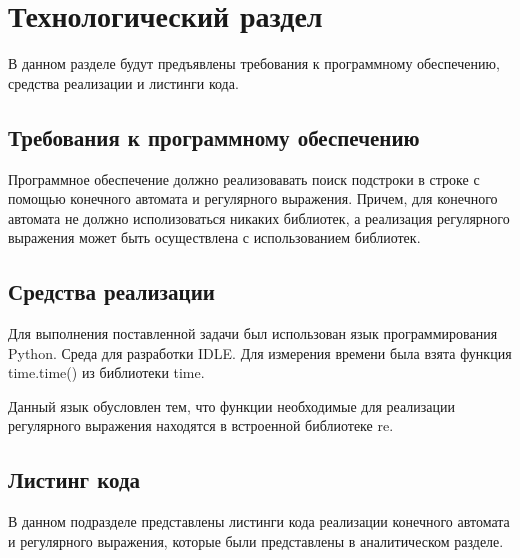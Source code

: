 \documentclass[12pt, a4paper]{report}
\begin{document}
	
	\chapter{Технологический раздел}
	\vspace{-0.5cm}В данном разделе будут предъявлены требования к программному обеспечению, средства реализации и листинги кода.
	
	\section{Требования к программному обеспечению}
	Программное обеспечение должно реализовавать поиск подстроки в строке с помощью конечного автомата и регулярного выражения. Причем, для конечного автомата не должно исполизоваться никаких библиотек, а реализация регулярного выражения может быть осуществлена с использованием библиотек.
	\section{Средства реализации}
	Для выполнения поставленной задачи был использован язык программирования Python. Среда для разработки IDLE. Для измерения времени была взята функция time.time() из библиотеки time.
	
	\vspace{0.2cm}Данный язык обусловлен тем, что функции необходимые для реализации регулярного выражения находятся в встроенной библиотеке re.
	
	
	\section{Листинг кода}
	В данном подразделе представлены листинги кода реализации конечного автомата и регулярного выражения, которые были представлены в аналитическом разделе.
\end{document}
